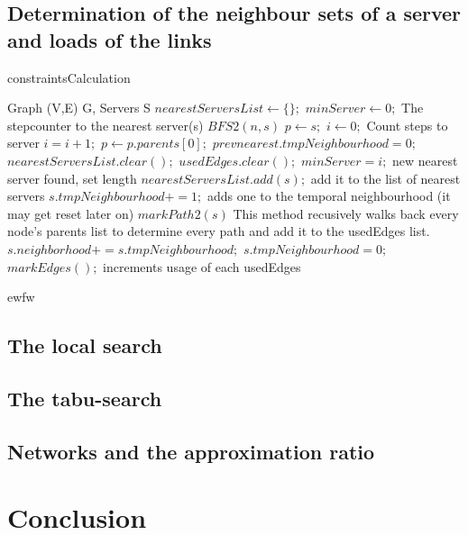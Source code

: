 \documentclass [12pt]{article}
\begin{document}
    \subsection{Determination of the neighbour sets of a server and loads of the links}
    \begin{algorithm}[H]
        \caption{constraintsCalculation}
        \begin{algorithmic}[2]
            \Require Graph (V,E) G, Servers S
                    \State $nearestServersList \gets \{\};$ 
                    \State $minServer \gets 0;$ \Comment The stepcounter to the nearest server(s)
                        \State $BFS2(n,s)$
                        \State $p \gets s;$
                        \State $i \gets 0;$ \Comment Count steps to server
                            \State $i=i+1;$
                            \State $p \gets p.parents[0];$
                        \EndWhile
                                    \State $prevnearest.tmpNeighbourhood=0;$
                                    \State $nearestServersList.clear();$
                                    \State $usedEdges.clear();$
                                \EndFor
                            \EndIf
                            \State $minServer = i;$ \Comment new nearest server found, set length
                            \State $nearestServersList.add(s);$ \Comment add it to the list of nearest servers 
                            \State $s.tmpNeighbourhood += 1;$ \Comment adds one to the temporal neighbourhood (it may get reset later on)
                            \State $markPath2(s)$ \Comment This method recusively walks back every node's parents list to determine every path and add it to the usedEdges list.
                        \EndIf 
                    \EndFor
                            \State $s.neighborhood += s.tmpNeighbourhood;$
                            \State $s.tmpNeighbourhood = 0;$
                        \EndFor
                    \State $markEdges();$ \Comment increments usage of each usedEdges
                \EndIf
            \EndFor
        \end{algorithmic}
    \end{algorithm}
ewfw
    \subsection{The local search}
    \subsection{The tabu-search}
    \subsection{Networks and the approximation ratio}
\section{Conclusion}


\end{document}
